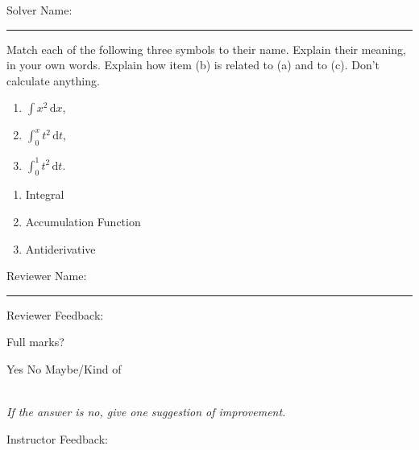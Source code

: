 \documentclass[12pt]{exam}
\newcommand{\dl}{\mathrm{d}}
\begin{document}
\pagestyle{headandfoot}
\firstpageheadrule

Solver Name:\enspace\rule{5cm}{0.8pt}

\begin{questions}
\question

Match each of the following three symbols to their name. Explain their meaning, in your own words. Explain how item (b) is related to (a) and to (c). Don't calculate anything.

\begin{multicols}{2}
\begin{enumerate}[label=(\alph*)]
\item $\int x^2 \,\dl x$,
\item $\int_0^x t^2 \,\dl t$,
\item $\int_0^1 t^2 \,\dl t$.
\end{enumerate}
\columnbreak
\begin{enumerate}[label=(\Alph*)]
\item Integral
\item Accumulation Function
\item Antiderivative
\end{enumerate}
\end{multicols}

\end{questions}

Reviewer Name:\enspace\rule{5cm}{0.8pt}

\begin{questions}
\question
Reviewer Feedback:

Full marks? \begin{oneparcheckboxes}
\choice Yes
\choice No
\choice Maybe/Kind of
\end{oneparcheckboxes}\\
\textit{If the answer is no, give one suggestion of improvement.}

\question

Instructor Feedback:

\end{questions}
\end{document}
